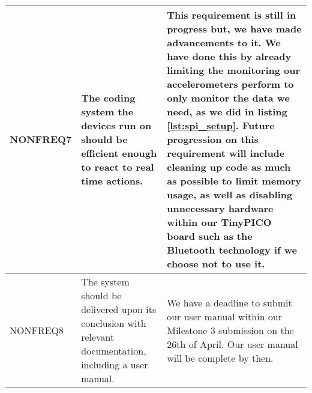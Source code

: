 \begin{xltabular}[H]{1.4\textwidth}{p{0.2\textwidth} | p{0.5\textwidth} | p{0.8\textwidth}}
        NONFREQ7

        &

        The coding system the devices run on should be efficient enough to react to real time actions.

        &

        This requirement is still in progress but, we have made advancements to it. We have done this by already limiting the monitoring our accelerometers perform to only monitor the data we need, as we did in listing \ref{lst:spi_setup}. Future progression on this requirement will include cleaning up code as much as possible to limit memory usage, as well as disabling unnecessary hardware within our TinyPICO board such as the Bluetooth technology if we choose not to use it.\\

		\midrule

        NONFREQ8

        &

        The system should be delivered upon its conclusion with relevant documentation, including a user manual.

        &

        We have a deadline to submit our user manual within our Milestone 3 submission on the 26th of April. Our user manual will be complete by then.\\

	\end{xltabular}
	\label{tbl:non_func_reqs_table}
